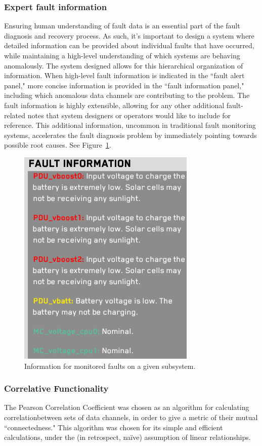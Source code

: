 \subsubsection{Expert fault information}

Ensuring human understanding of fault data is an essential part of the fault diagnosis and recovery process. As such, it's important to design a system where detailed information can be provided about individual faults that have occurred, while maintaining a high-level understanding of which systems are behaving anomalously. The system designed allows for this hierarchical organization of information. When high-level fault information is indicated in the ``fault alert panel," more concise information is provided in the ``fault information panel," including which anomalous data channels are contributing to the problem. The fault information is highly extensible, allowing for any other additional fault-related notes that system designers or operators would like to include for reference. This additional information, uncommon in traditional fault monitoring systems, accelerates the fault diagnosis problem by immediately pointing towards possible root causes. See Figure~\ref{fig:fault_info2}.

\begin{figure}[h]
\centering
    \includegraphics[width=0.4\columnwidth]{images/fault_info2.png}
    \caption{Information for monitored faults on a given subsystem.}
    \label{fig:fault_info2}
\end{figure}

\subsubsection{Correlative Functionality}

The Pearson Correlation Coefficient was chosen as an algorithm for calculating correlationbetween sets of data channels, in order to give a metric of their mutual ``connectedness." This algorithm was chosen for its simple and efficient calculations, under the (in retrospect, naïve) assumption of linear relationships.

